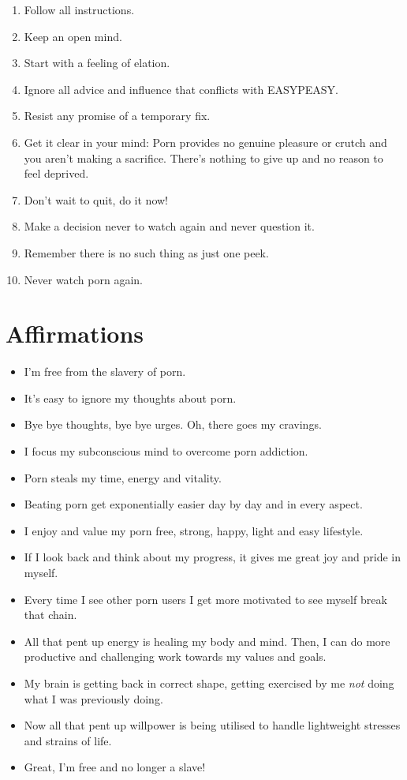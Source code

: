 \documentclass[easypeasy.tex]{subfiles}
\begin{document}
\begin{enumerate}
\item Follow all instructions.
\item Keep an open mind.
\item Start with a feeling of elation.
\item Ignore all advice and influence that conflicts with EASYPEASY.
\item Resist any promise of a temporary fix.
\item Get it clear in your mind: Porn provides no genuine pleasure or crutch and you aren't making a sacrifice. There's nothing to give up and no reason to feel deprived.
\item Don't wait to quit, do it now!
\item Make a decision never to watch again and never question it.
\item Remember there is no such thing as just one peek.
\item Never watch porn again.
\end{enumerate}

\section{Affirmations}

\begin{itemize}
\item I'm free from the slavery of porn.
\item It's easy to ignore my thoughts about porn.
\item Bye bye thoughts, bye bye urges. Oh, there goes my cravings.
\item I focus my subconscious mind to overcome porn addiction.
\item Porn steals my time, energy and vitality.
\item Beating porn get exponentially easier day by day and in every aspect.
\item I enjoy and value my porn free, strong, happy, light and easy lifestyle.
\item If I look back and think about my progress, it gives me great joy and pride in myself.
\item Every time I see other porn users I get more motivated to see myself break that chain.
\item All that pent up energy is healing my body and mind. Then, I can do more productive and challenging work towards my values and goals.
\item My brain is getting back in correct shape, getting exercised by me \textit{not} doing what I was previously doing.
\item Now all that pent up willpower is being utilised to handle lightweight stresses and strains of life.
\item Great, I'm free and no longer a slave!
\end{itemize}
\end{document}

